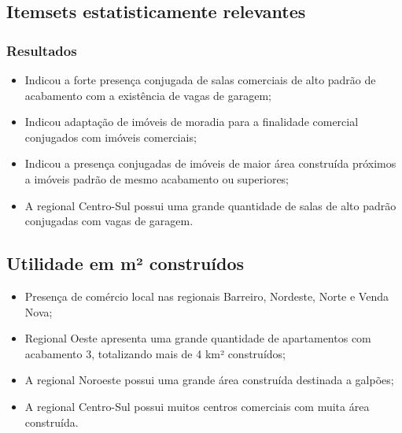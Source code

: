 \subsection{Itemsets estatisticamente relevantes}
\begin{frame}
 \frametitle{Resultados}
   \begin{itemize}
    
        \item Indicou a forte presença conjugada de salas comerciais de alto padrão de acabamento com a existência de vagas de garagem;
        \item Indicou adaptação de imóveis de moradia para a finalidade comercial conjugados com imóveis comerciais;
        \item Indicou a presença conjugadas de imóveis de maior área construída próximos a imóveis padrão de mesmo acabamento ou superiores;
        \item A regional Centro-Sul possui uma grande quantidade de salas de alto padrão conjugadas com vagas de garagem.
    \end{itemize}

\end{frame}

\subsection{Utilidade em m² construídos}
\begin{frame}

    \begin{itemize}
    
        \item Presença de comércio local nas regionais Barreiro, Nordeste, Norte e Venda Nova;
        \item Regional Oeste apresenta uma grande quantidade de apartamentos com acabamento 3, totalizando mais de 4 km² construídos;
	\item A regional Noroeste possui uma grande área construída destinada a galpões;
        \item A regional Centro-Sul possui muitos centros comerciais com muita área construída.
    \end{itemize}
\end{frame}

